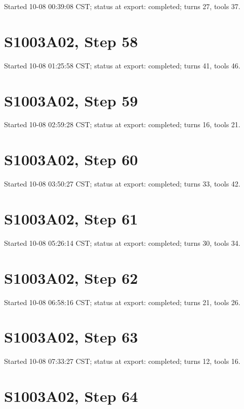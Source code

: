 \documentclass[
  10pt,
]{report}
\begin{document}
Started 10-08 00:39:08 CST; status at export: completed; turns 27, tools
37.

\hypertarget{s1003a02-step-58}{%
\section{S1003A02, Step 58}\label{s1003a02-step-58}}

Started 10-08 01:25:58 CST; status at export: completed; turns 41, tools
46.

\hypertarget{s1003a02-step-59}{%
\section{S1003A02, Step 59}\label{s1003a02-step-59}}

Started 10-08 02:59:28 CST; status at export: completed; turns 16, tools
21.

\hypertarget{s1003a02-step-60}{%
\section{S1003A02, Step 60}\label{s1003a02-step-60}}

Started 10-08 03:50:27 CST; status at export: completed; turns 33, tools
42.

\hypertarget{s1003a02-step-61}{%
\section{S1003A02, Step 61}\label{s1003a02-step-61}}

Started 10-08 05:26:14 CST; status at export: completed; turns 30, tools
34.

\hypertarget{s1003a02-step-62}{%
\section{S1003A02, Step 62}\label{s1003a02-step-62}}

Started 10-08 06:58:16 CST; status at export: completed; turns 21, tools
26.

\hypertarget{s1003a02-step-63}{%
\section{S1003A02, Step 63}\label{s1003a02-step-63}}

Started 10-08 07:33:27 CST; status at export: completed; turns 12, tools
16.

\hypertarget{s1003a02-step-64}{%
\section{S1003A02, Step 64}\label{s1003a02-step-64}}
\end{document}

